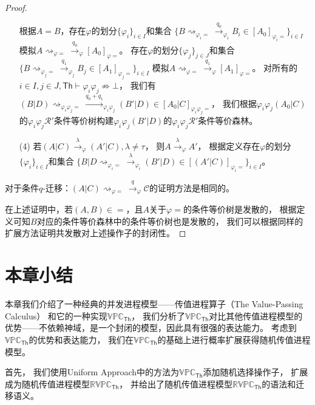 \begin{proof}
\begin{itemize}
{         根据$A=B$，存在$\varphi$的划分$\{\varphi_i\}_{i\in I}$和集合
         $\{B\rightsquigarrow_{\varphi_i=}\stackrel{q_0}{\rightarrow}_{\varphi_i}B_i\in [A_0]_{\varphi_i =}\}_{i\in I}$
         模拟$A\rightsquigarrow_{\varphi = }\stackrel{q_0}{\rightarrow}_{\varphi}[A_0]_{\varphi=}$。
         存在$\varphi$的划分$\{\varphi_j\}_{j\in J}$和集合
         $\{B\rightsquigarrow_{\varphi_j=}\stackrel{q_1}{\rightarrow}_{\varphi_j}B_j\in [A_1]_{\varphi_j =}\}_{i\in I}$
         模拟$A\rightsquigarrow_{\varphi = }\stackrel{q_1}{\rightarrow}_{\varphi}[A_1]_{\varphi=}$。
         对所有的$i\in I, j\in J, \mathsf{Th}\vdash \varphi_i\varphi_j\not\Rightarrow \bot$，
         我们有$(B|D)\rightsquigarrow_{\varphi_i\varphi_j=}\stackrel{q_0+q_1}{\longrightarrow}_{\varphi_i\varphi_j}(B'|D)\in[A_0|C]_{\varphi_i\varphi_j=}$，
         我们根据$\varphi_i\varphi_j (A_0|C)$的$\varphi_i\varphi_j \mathcal{R}' $条件等价树构建$\varphi_i\varphi_j(B'|D)$的$\varphi_i\varphi_j \mathcal{R}' $条件等价森林。
      }
      \item[(4)] {
         若$(A|C)\stackrel{\lambda}{\rightarrow}_{\varphi} (A'|C), \lambda\neq \tau$，
         则$A\stackrel{\lambda}{\rightarrow}_{\varphi} A'$，
         根据定义存在$\varphi$的划分$\{\varphi_i\}_{i\in I}$和集合
         $\{B|D\rightsquigarrow_{\varphi_i=}\stackrel{\lambda}{\rightarrow}_{\varphi_i} (B'|D)\in [(A'|C)]_{\varphi_i=}\}_{i\in I}$。
      }
   \end{itemize}
   对于条件$q$-迁移：$(A|C)\rightsquigarrow_{\varphi=}\stackrel{q}{\rightarrow}_{\varphi}\mathcal{C}$的证明方法是相同的。

   在上述证明中，若$(A,B)\in =$，且$A$关于$\varphi =$的条件等价树是发散的，
   根据定义可知$B$对应的条件等价森林中的条件等价树也是发散的，
   我们可以根据同样的扩展方法证明共发散对上述操作子的封闭性。
\end{proof}

\section{本章小结}
本章我们介绍了一种经典的并发进程模型——传值进程算子（The Value-Passing Calculus）
和它的一种实现$\mathbb{VPC}_{\mathsf{Th}}$，
我们分析了$\mathbb{VPC}_{\mathsf{Th}}$对比其他传值进程模型的优势——不依赖神域，是一个封闭的模型，因此具有很强的表达能力。
考虑到$\mathbb{VPC}_{\mathsf{Th}}$的优势和表达能力，
我们在$\mathbb{VPC}_{\mathsf{Th}}$的基础上进行概率扩展获得随机传值进程模型。

首先，
我们使用Uniform Approach中的方法为$\mathbb{VPC}_{\mathsf{Th}}$添加随机选择操作子，
扩展成为随机传值进程模型$\mathbb{RVPC}_{\mathsf{Th}}$，
并给出了随机传值进程模型$\mathbb{RVPC}_{\mathsf{Th}}$的语法和迁移语义。

